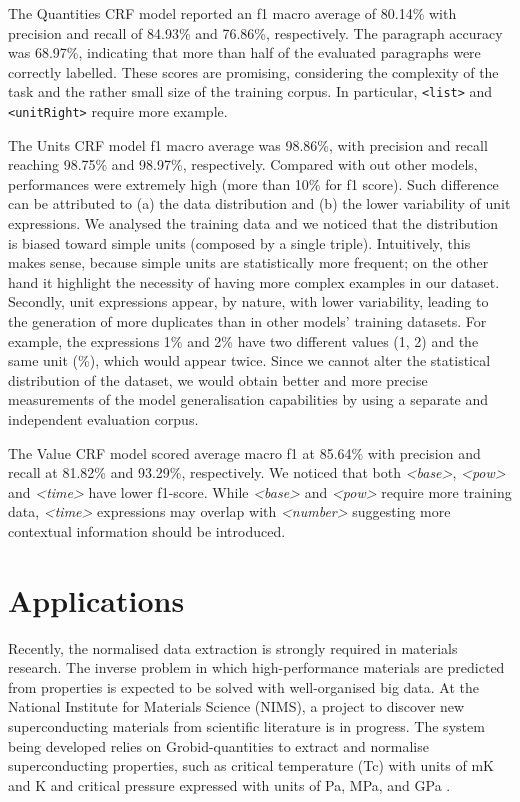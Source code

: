 \documentclass[sigconf]{acmart}
\begin{document}
The Quantities CRF model reported an f1 macro average of 80.14\% with precision and recall of 84.93\% and 76.86\%, respectively. The paragraph accuracy was 68.97\%, indicating that more than half of the evaluated paragraphs were correctly labelled. These scores are promising, considering the complexity of the task and the rather small size of the training corpus. In particular, \texttt{<list>} and \texttt{<unitRight>} require more example. 

The Units CRF model f1 macro average was 98.86\%, with precision and recall reaching 98.75\% and 98.97\%, respectively. Compared with out other models, performances were extremely high (more than 10\% for f1 score). 
Such difference can be attributed to (a) the data distribution and (b) the lower variability of unit expressions. We analysed the training data and we noticed that the distribution is biased toward simple units (composed by a single triple). Intuitively, this makes sense, because simple units are statistically more frequent; on the other hand it highlight the necessity of having more complex examples in our dataset. 
Secondly, unit expressions appear, by nature, with lower variability, leading to the generation of more duplicates than in other models' training datasets. For example, the expressions 1\% and 2\% have two different values (1, 2) and the same unit (\%), which would appear twice. 
Since we cannot alter the statistical distribution of the dataset, we would obtain better and more precise measurements of the model generalisation capabilities by using a separate and independent evaluation corpus. 

The Value CRF model scored average macro f1 at 85.64\% with precision and recall at 81.82\% and 93.29\%, respectively.
We noticed that both \textit{<base>}, \textit{<pow>} and \textit{<time>} have lower f1-score. While \textit{<base>} and \textit{<pow>} require more training data, \textit{<time>} expressions may overlap with \textit{<number>} suggesting more contextual information should be introduced. 


\section{Applications}
\label{sec:use_cases}
Recently, the normalised data extraction is strongly required in materials research. The inverse problem in which high-performance materials are predicted from properties is expected to be solved with well-organised big data. At the National Institute for Materials Science (NIMS), a project to discover new superconducting materials from scientific literature is in progress. The system being developed relies on Grobid-quantities to extract and normalise superconducting properties, such as critical temperature (Tc) with units of mK and K and critical pressure expressed with units of Pa, MPa, and GPa \cite{foppiano2019proposal}. 
\end{document}

